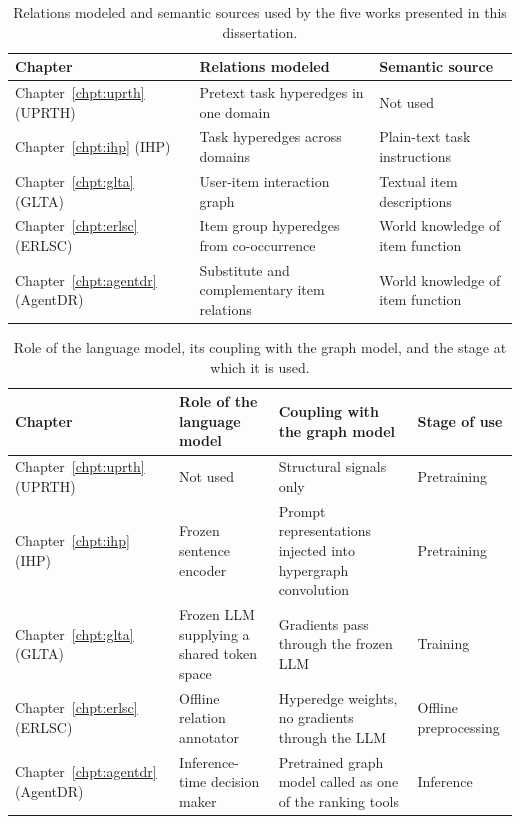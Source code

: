 \begin{table}[htbp]
\centering
\singlespacing
\small
\setlength{\tabcolsep}{5pt}
\renewcommand{\arraystretch}{1.15}
\begin{tabularx}{\textwidth}{@{}l >{\raggedright\arraybackslash}X >{\raggedright\arraybackslash}X@{}}
\toprule
Chapter & Relations modeled & Semantic source \\
\midrule
Chapter~\ref{chpt:uprth} (UPRTH) & Pretext task hyperedges in one domain & Not used \\
Chapter~\ref{chpt:ihp} (IHP) & Task hyperedges across domains & Plain-text task instructions \\
Chapter~\ref{chpt:glta} (GLTA) & User-item interaction graph & Textual item descriptions \\
Chapter~\ref{chpt:erlsc} (ERLSC) & Item group hyperedges from co-occurrence & World knowledge of item function \\
Chapter~\ref{chpt:agentdr} (AgentDR) & Substitute and complementary item relations & World knowledge of item function \\
\bottomrule
\end{tabularx}
\caption{Relations modeled and semantic sources used by the five works presented in this dissertation.}
\label{tab:overview-relations}
\end{table}

\begin{table}[htbp]
\centering
\singlespacing
\small
\setlength{\tabcolsep}{5pt}
\renewcommand{\arraystretch}{1.15}
\begin{tabularx}{\textwidth}{@{}l >{\hsize=0.9\hsize\raggedright\arraybackslash}X >{\hsize=1.35\hsize\raggedright\arraybackslash}X >{\hsize=0.75\hsize\raggedright\arraybackslash}X@{}}
\toprule
Chapter & Role of the language model & Coupling with the graph model & Stage of use \\
\midrule
Chapter~\ref{chpt:uprth} (UPRTH) & Not used & Structural signals only & Pretraining \\
Chapter~\ref{chpt:ihp} (IHP) & Frozen sentence encoder & Prompt representations injected into hypergraph convolution & Pretraining \\
Chapter~\ref{chpt:glta} (GLTA) & Frozen LLM supplying a shared token space & Gradients pass through the frozen LLM & Training \\
Chapter~\ref{chpt:erlsc} (ERLSC) & Offline relation annotator & Hyperedge weights, no gradients through the LLM & Offline preprocessing \\
Chapter~\ref{chpt:agentdr} (AgentDR) & Inference-time decision maker & Pretrained graph model called as one of the ranking tools & Inference \\
\bottomrule
\end{tabularx}
\caption{Role of the language model, its coupling with the graph model, and the stage at which it is used.}
\label{tab:overview-coupling}
\end{table}

